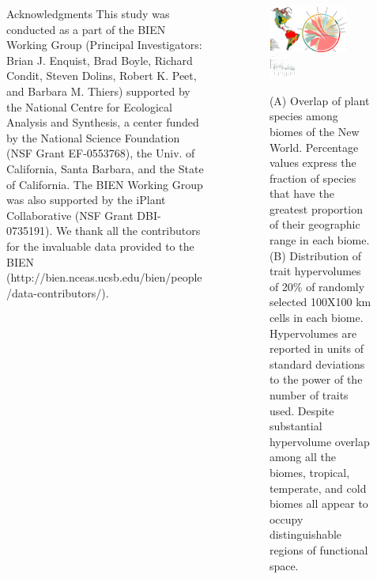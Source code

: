 \documentclass[final]{beamer}
\newlength{\sepwid}
\newlength{\onecolwid}
\newlength{\twocolwid}
\begin{document}
\begin{frame}[t]
\begin{columns}[t]
\begin{column}{\onecolwid}
	
      		\begin{block}{Acknowledgments}
\scriptsize This study was conducted as a part of the BIEN Working Group (Principal Investigators: Brian J. Enquist, Brad Boyle, Richard Condit, Steven Dolins, Robert K. Peet, and Barbara M. Thiers) supported by the National Centre for Ecological Analysis and Synthesis, a center funded by the National Science Foundation (NSF Grant EF-0553768), the Univ. of California, Santa Barbara, and the State of California. The BIEN Working Group was also supported by the iPlant Collaborative (NSF Grant DBI- 0735191). We thank all the contributors for the invaluable data provided to the BIEN (http://bien.nceas.ucsb.edu/bien/people/data-contributors/).
      		\end{block}


    \end{column}


    \begin{column}{\sepwid}\end{column}			%
    \begin{column}{\twocolwid}							%

\begin{figure}[h]
	\centering
	\includegraphics[width=0.75\textwidth]{./figures/Figure1.pdf}
	~
	\includegraphics[width=0.25\textwidth]{./figures/Hypervolume_sp_sample_gaussian20perc.pdf}
	\caption{(A) Overlap of plant species among biomes of the New World. Percentage values express the fraction of species that have the greatest proportion of their geographic range in each biome. (B) Distribution of trait hypervolumes of 20\% of randomly selected 100X100 km cells in each biome. Hypervolumes are reported in units of standard deviations to the power of the number of traits used.  Despite substantial hypervolume overlap among all the biomes, tropical, temperate, and cold biomes all appear to occupy distinguishable regions of functional space.}
	\label{fig:map}
\end{figure}




\end{column}
\end{columns}
\end{frame}
\end{document}
